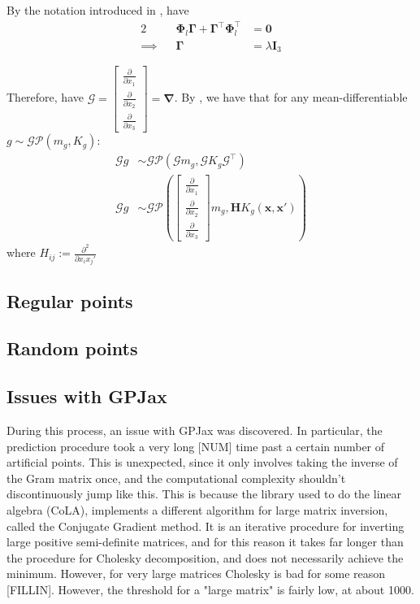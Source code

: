 \documentclass[12pt,a4paper,twoside]{report}
\theoremstyle{definition}
\begin{document}
By the notation introduced in , have 
\begin{alignat*}{2}
	\quad&&\boldsymbol \Phi_l\boldsymbol \Gamma + \boldsymbol \Gamma ^\top \boldsymbol \Phi_l^\top&=\mathbf 0\\
	\implies&&\boldsymbol \Gamma &= \lambda \mathbf I_3
\end{alignat*}

Therefore, have $\mathscr G = \begin{bmatrix} \frac{\partial}{\partial x_1} \\ \frac{\partial}{\partial x_2}\\\frac{\partial}{\partial x_3}\end{bmatrix} = \boldsymbol\nabla$. By , we have that for any mean-differentiable $g\sim \mathcal {GP}(m_g, K_g)$:
\begin{align*}
	\mathscr G g &\sim \mathcal {GP}\left( \mathscr G m_g, \mathscr G K_g \mathscr G^\top \right)\\
	\mathscr G g &\sim \mathcal {GP}\left( 
\begin{bmatrix} \frac{\partial}{\partial x_1} \\ \frac{\partial}{\partial x_2}\\\frac{\partial}{\partial x_3}\end{bmatrix} m_g,
		\mathbf H K_g(\mathbf x,\mathbf x') 
\right)
\end{align*}
where $H_{ij}:=\frac{\partial^2}{\partial x_ix_j'}$

\subsection{Regular points}

\subsection{Random points}

\subsection{Issues with GPJax}
During this process, an issue with GPJax was discovered. In particular, the prediction procedure took a very long [NUM] time past a certain number of artificial points. This is unexpected, since it only involves taking the inverse of the Gram matrix once, and the computational complexity shouldn't discontinuously jump like this. This is because the library used to do the linear algebra (CoLA), implements a different algorithm for large matrix inversion, called the Conjugate Gradient method. It is an iterative procedure for inverting large positive semi-definite matrices, and for this reason it takes far longer than the procedure for Cholesky decomposition, and does not necessarily achieve the minimum. However, for very large matrices Cholesky is bad for some reason [FILLIN]. However, the threshold for a "large matrix" is fairly low, at about 1000.
\end{document}
